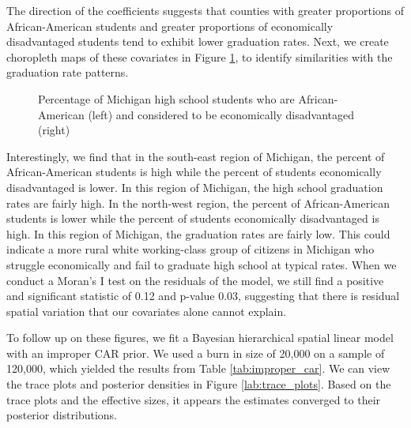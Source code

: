 \documentclass[12pt,letterpaper]{article}
\begin{document}
The direction of the coefficients suggests that counties with greater proportions of African-American students and greater proportions of economically disadvantaged students tend to exhibit lower graduation rates. Next, we create choropleth maps of these covariates in Figure \ref{lab:covar_plots}, to identify similarities with the graduation rate patterns.

\begin{figure}[h!]
\caption{Percentage of Michigan high school students who are African-American (left) and considered to be economically disadvantaged (right)}
\centering
\begin{minipage}{.5\textwidth}
  \centering
  \scalebox{.81}{
 \trimbox{1cm 2cm 0cm 0cm}{}
 }
\end{minipage}%
\begin{minipage}{.5\textwidth}
  \centering
  \scalebox{.81}{
 \trimbox{0cm 2cm -1cm 0cm}{}
 }
\end{minipage}

\label{lab:covar_plots}
\end{figure}

Interestingly, we find that in the south-east region of Michigan, the percent of African-American students is high while the percent of students economically disadvantaged is lower. In this region of Michigan, the high school graduation rates are fairly high. In the north-west region, the percent of African-American students is lower while the percent of students economically disadvantaged is high. In this region of Michigan, the graduation rates are fairly low. This could indicate a more rural white working-class group of citizens in Michigan who struggle economically and fail to graduate high school at typical rates. When we conduct a Moran's I test on the residuals of the model, we still find a positive and significant statistic of 0.12 and p-value 0.03, suggesting that there is residual spatial variation that our covariates alone cannot explain. 


To follow up on these figures, we fit a Bayesian hierarchical spatial linear model with an improper CAR prior. We used a burn in size of 20,000 on a sample of 120,000, which yielded the results from Table \ref{tab:improper_car}. We can view the trace plots and posterior densities in Figure \ref{lab:trace_plots}. Based on the trace plots and the effective sizes, it appears the estimates  converged to their posterior distributions.
\end{document}
